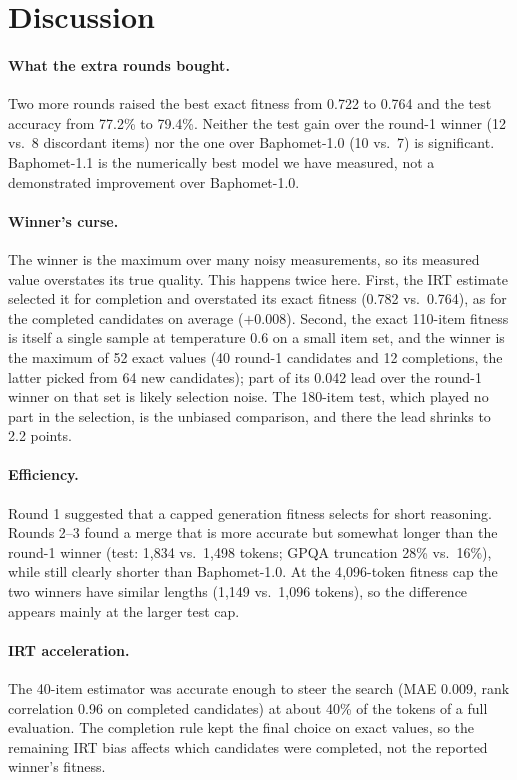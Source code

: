 \section{Discussion}
\paragraph{What the extra rounds bought.} Two more rounds raised the best exact fitness from 0.722 to 0.764 and the test accuracy from 77.2\% to 79.4\%. Neither the test gain over the round-1 winner (12 vs.\ 8 discordant items) nor the one over Baphomet-1.0 (10 vs.\ 7) is significant. Baphomet-1.1 is the numerically best model we have measured, not a demonstrated improvement over Baphomet-1.0.

\paragraph{Winner's curse.} The winner is the maximum over many noisy measurements, so its measured value overstates its true quality. This happens twice here. First, the IRT estimate selected it for completion and overstated its exact fitness (0.782 vs.\ 0.764), as for the completed candidates on average ($+0.008$). Second, the exact 110-item fitness is itself a single sample at temperature 0.6 on a small item set, and the winner is the maximum of 52 exact values (40 round-1 candidates and 12 completions, the latter picked from 64 new candidates); part of its 0.042 lead over the round-1 winner on that set is likely selection noise. The 180-item test, which played no part in the selection, is the unbiased comparison, and there the lead shrinks to 2.2 points.

\paragraph{Efficiency.} Round 1 suggested that a capped generation fitness selects for short reasoning. Rounds 2--3 found a merge that is more accurate but somewhat longer than the round-1 winner (test: 1{,}834 vs.\ 1{,}498 tokens; GPQA truncation 28\% vs.\ 16\%), while still clearly shorter than Baphomet-1.0. At the 4{,}096-token fitness cap the two winners have similar lengths (1{,}149 vs.\ 1{,}096 tokens), so the difference appears mainly at the larger test cap.

\paragraph{IRT acceleration.} The 40-item estimator was accurate enough to steer the search (MAE 0.009, rank correlation 0.96 on completed candidates) at about 40\% of the tokens of a full evaluation. The completion rule kept the final choice on exact values, so the remaining IRT bias affects which candidates were completed, not the reported winner's fitness.

